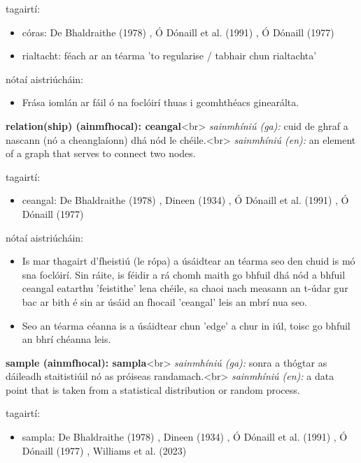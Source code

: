 \documentclass{article}
\begin{document}
tagairtí:
\begin{itemize}
	\item córas: De Bhaldraithe (1978) \cite{de-bhaldraithe}, Ó Dónaill et al. (1991) \cite{focloir-beag}, Ó Dónaill (1977) \cite{odonaill}
	\item rialtacht: féach ar an téarma 'to regularise / tabhair chun rialtachta'
\end{itemize}

nótaí aistriúcháin:
\begin{itemize}
	\item Frása iomlán ar fáil ó na foclóirí thuas i gcomhthéacs ginearálta.
\end{itemize}


\textbf{relation(ship) (ainmfhocal): ceangal}<br>
\textit{sainmhíniú (ga):} cuid de ghraf a nascann (nó a cheanglaíonn) dhá nód le chéile.<br>
\textit{sainmhíniú (en):} an element of a graph that serves to connect two nodes.

tagairtí:
\begin{itemize}
	\item ceangal: De Bhaldraithe (1978) \cite{de-bhaldraithe}, Dineen (1934) \cite{dineen}, Ó Dónaill et al. (1991) \cite{focloir-beag}, Ó Dónaill (1977) \cite{odonaill}
\end{itemize}

nótaí aistriúcháin:
\begin{itemize}
	\item Is mar thagairt d'fheistiú (le rópa) a úsáidtear an téarma seo den chuid is mó sna foclóirí. Sin ráite, is féidir a rá chomh maith go bhfuil dhá nód a bhfuil ceangal eatarthu 'feistithe' lena chéile, sa chaoi nach measann an t-údar gur bac ar bith é sin ar úsáid an fhocail 'ceangal' leis an mbrí nua seo.
	\item Seo an téarma céanna is a úsáidtear chun 'edge' a chur in iúl, toisc go bhfuil an bhrí chéanna leis.
\end{itemize}


\textbf{sample (ainmfhocal): sampla}<br>
\textit{sainmhíniú (ga):} sonra a thógtar as dáileadh staitistiúil nó as próiseas randamach.<br>
\textit{sainmhíniú (en):} a data point that is taken from a statistical distribution or random process.

tagairtí:
\begin{itemize}
	\item sampla: De Bhaldraithe (1978) \cite{de-bhaldraithe}, Dineen (1934) \cite{dineen}, Ó Dónaill et al. (1991) \cite{focloir-beag}, Ó Dónaill (1977) \cite{odonaill}, Williams et al. (2023) \cite{storchiste}
\end{itemize}
\end{document}
